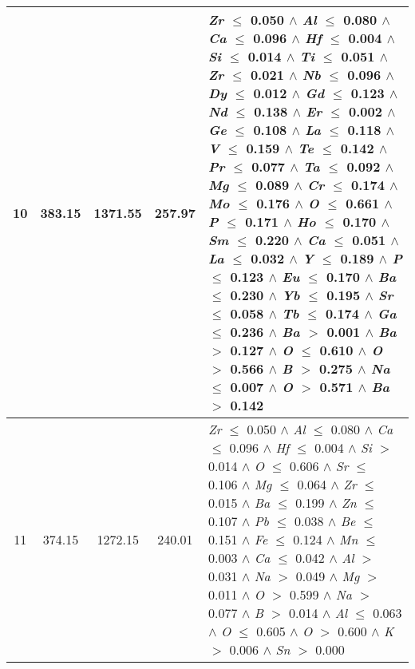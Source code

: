 \begin{table}[!htbp]
\begin{tabular}{ccccm{}}
		\hline
		10 & 383.15 & 1371.55 & 257.97 & \textit{Zr} $\le$ 0.050 $\wedge$ \textit{Al} $\le$ 0.080 $\wedge$ \textit{Ca} $\le$ 0.096 $\wedge$ \textit{Hf} $\le$ 0.004 $\wedge$ \textit{Si} $\le$ 0.014 $\wedge$ \textit{Ti} $\le$ 0.051 $\wedge$ \textit{Zr} $\le$ 0.021 $\wedge$ \textit{Nb} $\le$ 0.096 $\wedge$ \textit{Dy} $\le$ 0.012 $\wedge$ \textit{Gd} $\le$ 0.123 $\wedge$ \textit{Nd} $\le$ 0.138 $\wedge$ \textit{Er} $\le$ 0.002 $\wedge$ \textit{Ge} $\le$ 0.108 $\wedge$ \textit{La} $\le$ 0.118 $\wedge$ \textit{V} $\le$ 0.159 $\wedge$ \textit{Te} $\le$ 0.142 $\wedge$ \textit{Pr} $\le$ 0.077 $\wedge$ \textit{Ta} $\le$ 0.092 $\wedge$ \textit{Mg} $\le$ 0.089 $\wedge$ \textit{Cr} $\le$ 0.174 $\wedge$ \textit{Mo} $\le$ 0.176 $\wedge$ \textit{O} $\le$ 0.661 $\wedge$ \textit{P} $\le$ 0.171 $\wedge$ \textit{Ho} $\le$ 0.170 $\wedge$ \textit{Sm} $\le$ 0.220 $\wedge$ \textit{Ca} $\le$ 0.051 $\wedge$ \textit{La} $\le$ 0.032 $\wedge$ \textit{Y} $\le$ 0.189 $\wedge$ \textit{P} $\le$ 0.123 $\wedge$ \textit{Eu} $\le$ 0.170 $\wedge$ \textit{Ba} $\le$ 0.230 $\wedge$ \textit{Yb} $\le$ 0.195 $\wedge$ \textit{Sr} $\le$ 0.058 $\wedge$ \textit{Tb} $\le$ 0.174 $\wedge$ \textit{Ga} $\le$ 0.236 $\wedge$ \textit{Ba} $>$ 0.001 $\wedge$ \textit{Ba} $>$ 0.127 $\wedge$ \textit{O} $\le$ 0.610 $\wedge$ \textit{O} $>$ 0.566 $\wedge$ \textit{B} $>$ 0.275 $\wedge$ \textit{Na} $\le$ 0.007 $\wedge$ \textit{O} $>$ 0.571 $\wedge$ \textit{Ba} $>$ 0.142\\
		\hline
		11 & 374.15 & 1272.15 & 240.01 & \textit{Zr} $\le$ 0.050 $\wedge$ \textit{Al} $\le$ 0.080 $\wedge$ \textit{Ca} $\le$ 0.096 $\wedge$ \textit{Hf} $\le$ 0.004 $\wedge$ \textit{Si} $>$ 0.014 $\wedge$ \textit{O} $\le$ 0.606 $\wedge$ \textit{Sr} $\le$ 0.106 $\wedge$ \textit{Mg} $\le$ 0.064 $\wedge$ \textit{Zr} $\le$ 0.015 $\wedge$ \textit{Ba} $\le$ 0.199 $\wedge$ \textit{Zn} $\le$ 0.107 $\wedge$ \textit{Pb} $\le$ 0.038 $\wedge$ \textit{Be} $\le$ 0.151 $\wedge$ \textit{Fe} $\le$ 0.124 $\wedge$ \textit{Mn} $\le$ 0.003 $\wedge$ \textit{Ca} $\le$ 0.042 $\wedge$ \textit{Al} $>$ 0.031 $\wedge$ \textit{Na} $>$ 0.049 $\wedge$ \textit{Mg} $>$ 0.011 $\wedge$ \textit{O} $>$ 0.599 $\wedge$ \textit{Na} $>$ 0.077 $\wedge$ \textit{B} $>$ 0.014 $\wedge$ \textit{Al} $\le$ 0.063 $\wedge$ \textit{O} $\le$ 0.605 $\wedge$ \textit{O} $>$ 0.600 $\wedge$ \textit{K} $>$ 0.006 $\wedge$ \textit{Sn} $>$ 0.000\\
		\bottomrule
	\end{tabular}
\end{table}
